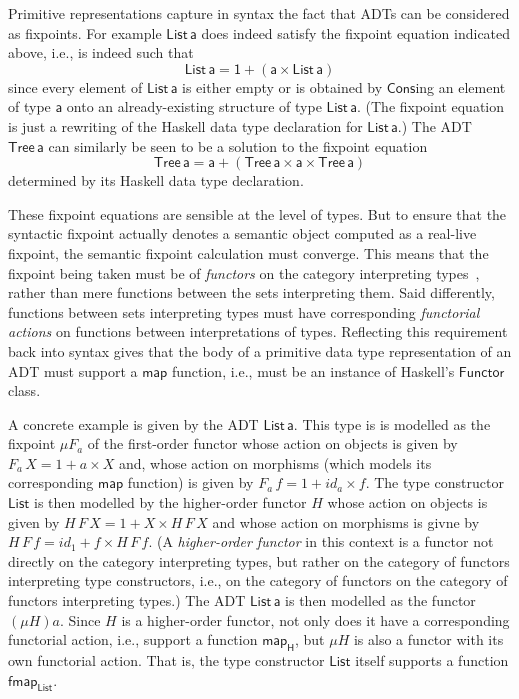 \documentclass[acmsmall,screen,review,anonymous]{acmart}
\theoremstyle{definition}
\renewcommand{\id}{\mathit{id}}
\begin{document}
Primitive representations capture in syntax the fact that ADTs can be
considered as fixpoints. For example $\mathsf{List\,a}$ does indeed
satisfy the fixpoint equation indicated above, i.e., is indeed such
that
\[\mathsf{List\,a} = \mathsf{1 + (a \times List\,a)}\] 
since every element of $\mathsf{List\,a}$ is either empty or is
obtained by $\mathsf{Cons}$ing an element of type $\mathsf{a}$ onto an
already-existing structure of type $\mathsf{List\,a}$. (The fixpoint
equation is just a rewriting of the Haskell data type declaration for
$\mathsf{List\,a}$.) The ADT $\mathsf{Tree\,a}$ can similarly be seen
to be a solution to the fixpoint equation
\[\mathsf{Tree\,a} = \mathsf{a + (Tree\,a \times a \times Tree\,a)}\] 
determined by its Haskell data type declaration.

These fixpoint equations are sensible at the level of types. But to
ensure that the syntactic fixpoint actually denotes a semantic object
computed as a real-live fixpoint, the semantic fixpoint calculation
must converge. This means that the fixpoint being taken must be of
{\em functors} on the category interpreting types~\cite{tfca}, rather
than mere functions between the sets interpreting them. Said
differently, functions between sets interpreting types must have
corresponding {\em functorial actions} on functions between
interpretations of types. Reflecting this requirement back into syntax
gives that the body of a primitive data type representation of an ADT
must support a $\mathsf{map}$ function, i.e., must be an instance of
Haskell's $\mathsf{Functor}$ class.

A concrete example is given by the ADT $\mathsf{List\,a}$. This type
is is modelled as the fixpoint $\mu F_a$ of the first-order functor
whose action on objects is given by $F_a\,X = 1 + a \times X$ and,
whose action on morphisms (which models its corresponding
$\mathsf{map}$ function) is given by $F_a\,f = 1 + \id_a \times
f$. The type constructor $\mathsf{List}$ is then modelled by the
higher-order functor $H$ whose action on objects is given by $H\,F\,X
= 1 + X \times H\,F\,X$ and whose action on morphisms is givne by
$H\,F\,f = \id_1 + f \times H\,F\,f$. (A {\em higher-order functor} in
this context is a functor not directly on the category interpreting
types, but rather on the category of functors interpreting type
constructors, i.e., on the category of functors on the category of
functors interpreting types.) The ADT $\mathsf{List\,a}$ is then
modelled as the functor $(\mu H)a$. Since $H$ is a higher-order
functor, not only does it have a corresponding functorial action,
i.e., support a function $\mathsf{map_H}$, but $\mu H$ is also a
functor with its own functorial action. That is, the type constructor
$\mathsf{List}$ itself supports a function $\mathsf{fmap_{List}}$.
\end{document}
